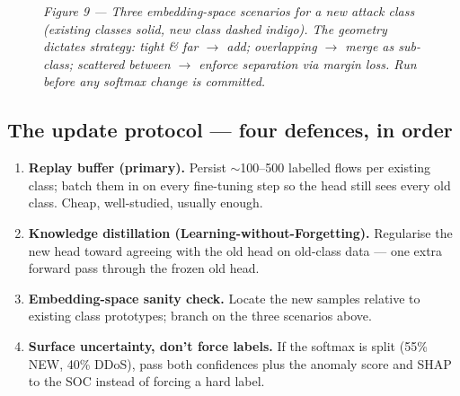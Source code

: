 \documentclass[11pt,a4paper]{article}
\begin{document}
\begin{figure}[H]
\caption*{\small\textit{Figure 9 --- Three embedding-space scenarios for a new attack class (existing classes solid, new class dashed indigo). The geometry dictates strategy: tight \& far $\to$ add; overlapping $\to$ merge as sub-class; scattered between $\to$ enforce separation via margin loss. Run before any softmax change is committed.}}
\end{figure}

\subsection{The update protocol --- four defences, in order}
\begin{enumerate}[leftmargin=*, itemsep=2pt]
  \item \textbf{Replay buffer (primary).} Persist $\sim$100--500 labelled flows per existing class; batch them in on every fine-tuning step so the head still sees every old class. Cheap, well-studied, usually enough.
  \item \textbf{Knowledge distillation (Learning-without-Forgetting).} Regularise the new head toward agreeing with the old head on old-class data --- one extra forward pass through the frozen old head.
  \item \textbf{Embedding-space sanity check.} Locate the new samples relative to existing class prototypes; branch on the three scenarios above.
  \item \textbf{Surface uncertainty, don't force labels.} If the softmax is split (55\% NEW, 40\% DDoS), pass both confidences plus the anomaly score and SHAP to the SOC instead of forcing a hard label.
\end{enumerate}
\end{document}
